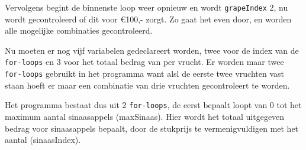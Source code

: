 Vervolgens begint de binnenste loop weer opnieuw en wordt {\tt grapeIndex} 2, nu wordt gecontroleerd of dit voor \euro100,- zorgt. Zo gaat het even door, en worden alle mogelijke combinaties gecontroleerd.


Nu moeten er nog vijf variabelen gedeclareert worden, twee voor de index van de {\tt for-loops} en 3 voor het totaal bedrag van per vrucht.
Er worden maar twee {\tt for-loops} gebruikt in het programma want alsl de eerste twee vruchten vast staan hoeft er maar een combinatie van drie vruchten gecontroleert te worden.
  
Het programma bestaat dus uit 2 {\tt for-loops}, de eerst  bepaalt loopt van 0 tot het maximum aantal sinaasappels (maxSinaas).
Hier wordt het totaal uitgegeven bedrag voor sinaasappels bepaalt, door de stukprijs te vermenigvuldigen met het aantal (sinaasIndex).

